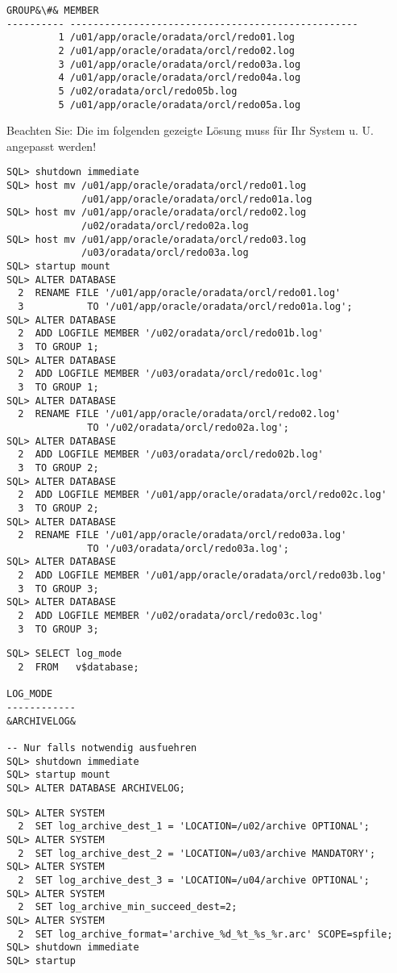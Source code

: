 \begin{enumerate}
\begin{lstlisting}[language=oracle_sql,alsolanguage=sqlplus]
    GROUP&\#& MEMBER
---------- --------------------------------------------------
         1 /u01/app/oracle/oradata/orcl/redo01.log
         2 /u01/app/oracle/oradata/orcl/redo02.log
         3 /u01/app/oracle/oradata/orcl/redo03a.log
         4 /u01/app/oracle/oradata/orcl/redo04a.log
         5 /u02/oradata/orcl/redo05b.log
         5 /u01/app/oracle/oradata/orcl/redo05a.log
        \end{lstlisting}
\clearpage
      
        Beachten Sie: Die im folgenden gezeigte Lösung muss für Ihr System u. U. angepasst werden!
        \begin{lstlisting}[language=oracle_sql,alsolanguage=sqlplus]
SQL> shutdown immediate
SQL> host mv /u01/app/oracle/oradata/orcl/redo01.log
             /u01/app/oracle/oradata/orcl/redo01a.log
SQL> host mv /u01/app/oracle/oradata/orcl/redo02.log
             /u02/oradata/orcl/redo02a.log
SQL> host mv /u01/app/oracle/oradata/orcl/redo03.log
             /u03/oradata/orcl/redo03a.log
SQL> startup mount
SQL> ALTER DATABASE
  2  RENAME FILE '/u01/app/oracle/oradata/orcl/redo01.log'
  3           TO '/u01/app/oracle/oradata/orcl/redo01a.log';
SQL> ALTER DATABASE
  2  ADD LOGFILE MEMBER '/u02/oradata/orcl/redo01b.log'
  3  TO GROUP 1;
SQL> ALTER DATABASE
  2  ADD LOGFILE MEMBER '/u03/oradata/orcl/redo01c.log'
  3  TO GROUP 1;
SQL> ALTER DATABASE
  2  RENAME FILE '/u01/app/oracle/oradata/orcl/redo02.log'
              TO '/u02/oradata/orcl/redo02a.log';
SQL> ALTER DATABASE
  2  ADD LOGFILE MEMBER '/u03/oradata/orcl/redo02b.log'
  3  TO GROUP 2;
SQL> ALTER DATABASE
  2  ADD LOGFILE MEMBER '/u01/app/oracle/oradata/orcl/redo02c.log'
  3  TO GROUP 2;
SQL> ALTER DATABASE
  2  RENAME FILE '/u01/app/oracle/oradata/orcl/redo03a.log'
              TO '/u03/oradata/orcl/redo03a.log';
SQL> ALTER DATABASE
  2  ADD LOGFILE MEMBER '/u01/app/oracle/oradata/orcl/redo03b.log'
  3  TO GROUP 3;
SQL> ALTER DATABASE
  2  ADD LOGFILE MEMBER '/u02/oradata/orcl/redo03c.log'
  3  TO GROUP 3;
        \end{lstlisting}
\clearpage		
      
        \begin{lstlisting}[language=oracle_sql,alsolanguage=sqlplus]
SQL> SELECT log_mode
  2  FROM   v$database;

LOG_MODE
------------
&ARCHIVELOG&

-- Nur falls notwendig ausfuehren
SQL> shutdown immediate
SQL> startup mount
SQL> ALTER DATABASE ARCHIVELOG;
        \end{lstlisting}
      
        \begin{lstlisting}[language=oracle_sql,alsolanguage=sqlplus]
SQL> ALTER SYSTEM
  2  SET log_archive_dest_1 = 'LOCATION=/u02/archive OPTIONAL';
SQL> ALTER SYSTEM
  2  SET log_archive_dest_2 = 'LOCATION=/u03/archive MANDATORY';
SQL> ALTER SYSTEM
  2  SET log_archive_dest_3 = 'LOCATION=/u04/archive OPTIONAL';
SQL> ALTER SYSTEM
  2  SET log_archive_min_succeed_dest=2;
SQL> ALTER SYSTEM
  2  SET log_archive_format='archive_%d_%t_%s_%r.arc' SCOPE=spfile;
SQL> shutdown immediate
SQL> startup
        \end{lstlisting}
    \end{enumerate}
\clearpage
